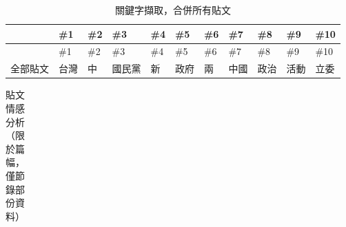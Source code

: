 \documentclass[a4paper, 10pt, conference]{ieeeconf}       %
\begin{document}
\begin{CJK}{UTF8}{bsmi}
\begin{longtable}[c]{@{}L{2.45cm}L{1.1cm}L{1.1cm}L{1.1cm}L{1.1cm}L{1.1cm}L{1.1cm}L{1.1cm}L{1.1cm}L{1.1cm}L{1.1cm}@{}}
\caption{關鍵字擷取，合併所有貼文}
\label{t4}\\
\toprule
 & \#1 & \#2 & \#3 & \#4 & \#5 & \#6 & \#7 & \#8 & \#9 & \#10 \\* \midrule
\endfirsthead
\toprule
 & \#1 & \#2 & \#3 & \#4 & \#5 & \#6 & \#7 & \#8 & \#9 & \#10 \\* \midrule
\endhead
%
\bottomrule
\endfoot
%
\endlastfoot
%
全部貼文 & 台灣 & 中 & 國民黨 & 新 & 政府 & 兩 & 中國 & 政治 & 活動 & 立委 \\* \bottomrule
\end{longtable}

\begin{landscape}
\begin{longtable}[c]{@{}L{2.45cm}L{1.1cm}L{1.1cm}L{1.1cm}L{1.1cm}L{1.1cm}L{1.1cm}L{1.1cm}L{1.1cm}L{1.1cm}L{1.1cm}L{1.1cm}L{1.1cm}L{1.1cm}L{1.1cm}@{}}
\caption{貼文情感分析{\small （限於篇幅，僅節錄部份資料）}}
\label{t5}\\
\toprule

\end{longtable}
\end{landscape}
\end{CJK}
\end{document}
